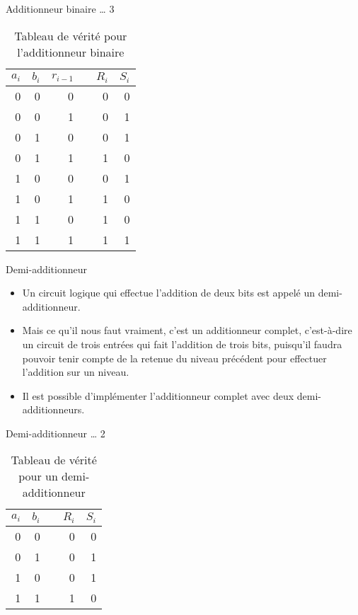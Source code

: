 \documentclass[presentation]{beamer}
\begin{document}
\begin{frame}[label={sec:orgb3368cf}]{Additionneur binaire \ldots{} 3}
\begin{table}[htbp]
\caption{\label{tab:org55986c3}Tableau de vérité pour l'additionneur binaire}
\centering
\begin{tabular}{rrrlrr}
\(a_{i}\) & \(b_{i}\) & \(r_{i-1}\) &  & \(R_{i}\) & \(S_{i}\)\\[0pt]
\hline
0 & 0 & 0 &  & 0 & 0\\[0pt]
0 & 0 & 1 &  & 0 & 1\\[0pt]
0 & 1 & 0 &  & 0 & 1\\[0pt]
0 & 1 & 1 &  & 1 & 0\\[0pt]
1 & 0 & 0 &  & 0 & 1\\[0pt]
1 & 0 & 1 &  & 1 & 0\\[0pt]
1 & 1 & 0 &  & 1 & 0\\[0pt]
1 & 1 & 1 &  & 1 & 1\\[0pt]
\end{tabular}
\end{table}
\end{frame}


\begin{frame}[label={sec:org6b11dfe}]{Demi-additionneur}
\begin{itemize}
\item Un circuit logique qui effectue l'addition de deux bits est appelé un demi-additionneur.

\item Mais ce qu'il nous faut vraiment, c'est un \alert{additionneur complet}, c'est-à-dire un circuit de trois entrées qui fait l'addition de trois bits, puisqu'il faudra pouvoir tenir compte de la retenue du niveau précédent pour effectuer l'addition sur un niveau.

\item Il est possible d'implémenter l'additionneur complet avec deux demi-additionneurs.
\end{itemize}
\end{frame}

\begin{frame}[label={sec:orgc701b88}]{Demi-additionneur \ldots{} 2}
\begin{table}[htbp]
\caption{\label{tab:org2d6c64f}Tableau de vérité pour un demi-additionneur}
\centering
\begin{tabular}{rrlrr}
\(a_{i}\) & \(b_{i}\) &  & \(R_{i}\) & \(S_{i}\)\\[0pt]
\hline
0 & 0 &  & 0 & 0\\[0pt]
0 & 1 &  & 0 & 1\\[0pt]
1 & 0 &  & 0 & 1\\[0pt]
1 & 1 &  & 1 & 0\\[0pt]
\end{tabular}
\end{table}
\end{frame}
\end{document}
